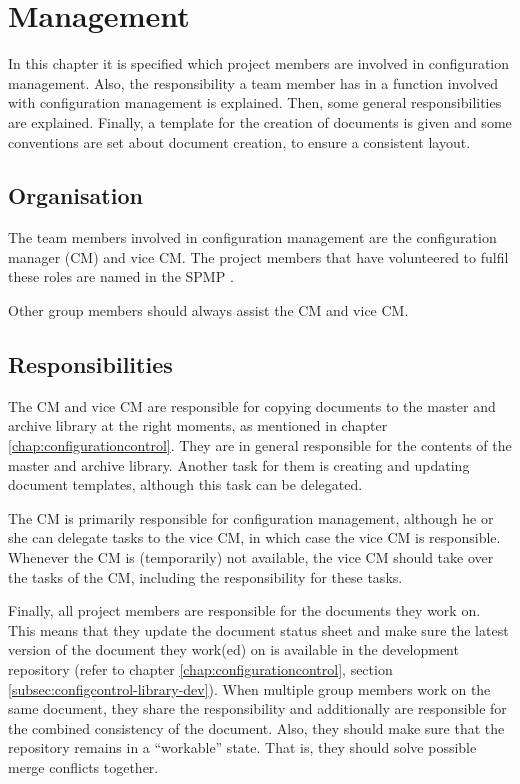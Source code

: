 \chapter{Management}
\label{chap:management}
In this chapter it is specified which project members are involved in configuration management. Also, the responsibility a team member has in a function involved with configuration management is explained. Then, some general responsibilities are explained. Finally, a template for the creation of documents is given and some conventions are set about document creation, to ensure a consistent layout.

\section{Organisation}
The team members involved in configuration management are the configuration manager (CM) and vice CM. The project members that have volunteered to fulfil these roles are named in the SPMP \cite{spmp}.

Other group members should always assist the CM and vice CM.

\section{Responsibilities}
The CM and vice CM are responsible for copying documents to the master and archive library at the right moments, as mentioned in chapter \ref{chap:configurationcontrol}. They are in general responsible for the contents of the master and archive library. Another task for them is creating and updating document templates, although this task can be delegated.

The CM is primarily responsible for configuration management, although he or she can delegate tasks to the vice CM, in which case the vice CM is responsible. Whenever the CM is (temporarily) not available, the vice CM should take over the tasks of the CM, including the responsibility for these tasks.

Finally, all project members are responsible for the documents they work on. This means that they update the document status sheet and make sure the latest version of the document they work(ed) on is available in the development repository (refer to chapter \ref{chap:configurationcontrol}, section \ref{subsec:configcontrol-library-dev}). When multiple group members work on the same document, they share the responsibility and additionally are responsible for the combined consistency of the document. Also, they should make sure that the repository remains in a ``workable'' state. That is, they should solve possible merge conflicts together.

